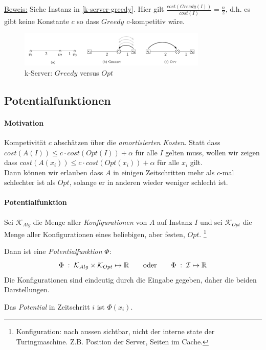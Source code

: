 \underline{Beweis:}
Siehe Instanz in \autoref{k-server-greedy}.
Hier gilt $\frac{cost(Greedy(I))}{cost(I)} = \frac{n}{2}$, d.h. es gibt keine Konstante $c$
so dass $Greedy$ $c$-kompetitiv wäre.

\begin{figure}[h]
    \centering
    \includegraphics[width=0.8\textwidth]{images/k-server-greedy.png}
    \caption{k-Server: $Greedy$ versus $Opt$}
    \label{k-server-greedy}
\end{figure}


\subsection{Potentialfunktionen}

\paragraph{Motivation}
Kompetivität $c$ abschätzen über die \emph{amortisierten Kosten}.
Statt dass $cost(A(I)) \leq c \cdot cost(Opt(I)) + \alpha$ für alle $I$ gelten muss,
wollen wir zeigen dass $cost(A(x_i)) \leq c \cdot cost(Opt(x_i)) + \alpha$ für alle $x_i$ gilt.
\\
Dann können wir erlauben dass $A$ in einigen Zeitschritten mehr als $c$-mal schlechter ist als $Opt$,
solange er in anderen wieder weniger schlecht ist.

\paragraph{Potentialfunktion}
Sei $\mathcal{K}_{Alg}$ die Menge aller \emph{Konfigurationen} von $A$ auf Instanz $I$
und sei $\mathcal{K}_{Opt}$ die Menge aller Konfigurationen eines beliebigen, aber festen, $Opt$.
\footnote{Konfiguration: nach aussen sichtbar, nicht der interne state der Turingmaschine.
Z.B. Position der Server, Seiten im Cache.}

Dann ist eine \emph{Potentialfunktion} $\Phi$:
$$
\Phi \; : \;  \mathcal{K}_{Alg} \times \mathcal{K}_{Opt} \mapsto \mathbb{R}
\qquad \text{oder} \qquad
\Phi \; : \; \mathcal{I} \mapsto \mathbb{R}
$$
Die Konfigurationen sind eindeutig durch die Eingabe gegeben, daher die beiden Darstellungen.

Das \emph{Potential} in Zeitschritt $i$ ist $\Phi(x_i)$.

